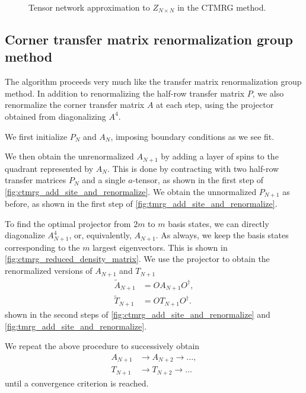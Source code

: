 \begin{figure}
  
  \caption{Tensor network approximation to $Z_{N \times N}$ in the CTMRG method.}
  \label{fig:partition_function_tensor_network}
\end{figure}

\subsection{Corner transfer matrix renormalization group method}

The algorithm proceeds very much like the transfer matrix renormalization group method. In addition to renormalizing the half-row transfer matrix $P$, we also renormalize the
corner transfer matrix $A$ at each step, using the projector obtained from diagonalizing
$A^4$.


We first initialize $P_N$ and $A_N$, imposing boundary conditions as we see fit.

We then obtain the unrenormalized $A_{N+1}$ by adding a layer of spins to the quadrant
represented by $A_N$. This is done by contracting with two half-row transfer matrices
$P_N$ and a single $a$-tensor, as shown in the first step of
\autoref{fig:ctmrg_add_site_and_renormalize}. We obtain the unnormalized $P_{N+1}$ as
before, as shown in the first step of \autoref{fig:tmrg_add_site_and_renormalize}.

To find the optimal projector from $2m$ to $m$ basis states, we can directly diagonalize
$A_{N + 1}^4$, or, equivalently, $A_{N + 1}$. As always, we keep the basis states
corresponding to the $m$ largest eigenvectors. This is shown in
\autoref{fig:ctmrg_reduced_density_matrix}. We use the projector to obtain the
renormalized versions of $A_{N + 1}$ and $T_{N + 1}$
\begin{align}
    \widetilde{A}_{N + 1} &= OA_{N + 1}O^{\dagger}, \\
    \widetilde{T}_{N + 1} &= OT_{N + 1}O^{\dagger}.
\end{align}
shown in the second steps of \autoref{fig:ctmrg_add_site_and_renormalize} and
\autoref{fig:tmrg_add_site_and_renormalize}.

We repeat the above procedure to successively obtain
\begin{align}
  A_{N + 1} & \rightarrow A_{N + 2} \rightarrow \dots, \\
  T_{N + 1} & \rightarrow T_{N + 2} \rightarrow \dots
\end{align}
until a convergence criterion is reached.

